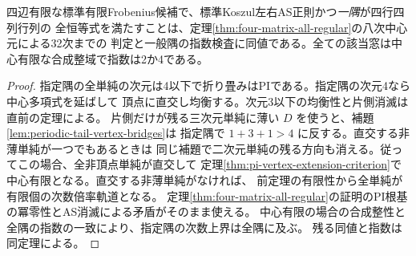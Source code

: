 \begin{corollary}\label{cor:single-four-matrix-all-regular}
四辺有限な標準有限Frobenius候補で、標準Koszul左右AS正則かつ\emph{一隅}が四行四列行列の
全恒等式を満たすことは、定理\ref{thm:four-matrix-all-regular}の八次中心元による32次までの
判定と一般隅の指数検査に同値である。全ての該当窓は中心有限な合成整域で指数は2か4である。
\end{corollary}
\begin{proof}
指定隅の全単純の次元は4以下で折り畳みはPIである。指定隅の次元4なら中心多項式を延ばして
頂点に直交し均衡する。次元3以下の均衡性と片側消滅は直前の定理による。
片側だけが残る三次元単純に薄い $D$ を使うと、補題\ref{lem:periodic-tail-vertex-bridges}は
指定隅で $1+3+1>4$ に反する。直交する非薄単純が一つでもあるときは
同じ補題で二次元単純の残る方向も消える。従ってこの場合、全非頂点単純が直交して
定理\ref{thm:pi-vertex-extension-criterion}で中心有限となる。直交する非薄単純がなければ、
前定理の有限性から全単純が有限個の次数倍率軌道となる。
定理\ref{thm:four-matrix-all-regular}の証明のPI根基の冪零性とAS消滅による矛盾がそのまま使える。
中心有限の場合の合成整性と全隅の指数の一致により、指定隅の次数上界は全隅に及ぶ。
残る同値と指数は同定理による。
\end{proof}
